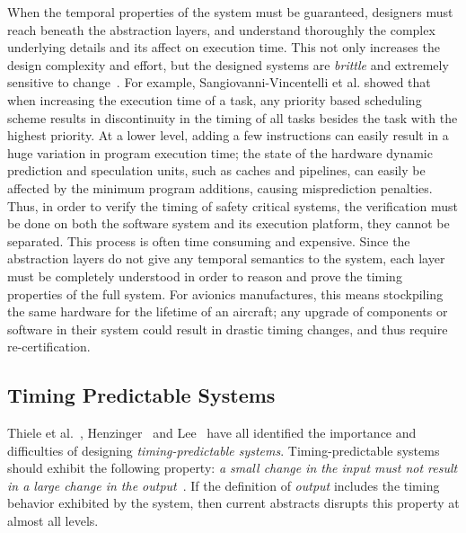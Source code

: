 When the temporal properties of the system must be guaranteed, designers must reach beneath the abstraction layers, and understand thoroughly the complex underlying details and its affect on execution time. 
This not only increases the design complexity and effort, but the designed systems are \emph{brittle} and extremely sensitive to change~\cite{Sangiovanni-Vincentelli2007automotive, edwards2007case}.  
For example, Sangiovanni-Vincentelli et al.\cite{Sangiovanni-Vincentelli2007automotive} showed that when increasing the execution time of a task, any priority based scheduling scheme results in discontinuity in the timing of all tasks besides the task with the highest priority. 
At a lower level, adding a few instructions can easily result in a huge variation in program execution time; the state of the hardware dynamic prediction and speculation units, such as caches and pipelines, can easily be affected by the minimum program additions, causing misprediction penalties.
Thus, in order to verify the timing of safety critical systems, the verification must be done on both the software system and its execution platform, they cannot be separated. 
This process is often time consuming and expensive.
Since the abstraction layers do not give any temporal semantics to the system, each layer must be completely understood in order to reason and prove the timing properties of the full system.  
For avionics manufactures, this means stockpiling the same hardware for the lifetime of an aircraft; any upgrade of components or software in their system could result in drastic timing changes, and thus require re-certification.


\subsection{Timing Predictable Systems}
Thiele et al.~\cite{thiele:04:predictable}, Henzinger~\cite{Henzinger2008} and Lee~\cite{LeeOnTime2005} have all identified the importance and difficulties of designing \emph{timing-predictable systems}.
Timing-predictable systems should exhibit the following property: \textit{a small change in the input must not result in a large change in the output}~\cite{Henzinger2008}.
If the definition of \emph{output} includes the timing behavior exhibited by the system, then current abstracts disrupts this property at almost all levels. 

